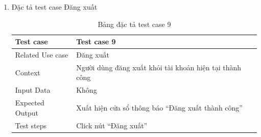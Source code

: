\documentclass[a4paper, 12pt]{article}
\begin{document}
\begin{enumerate}
	\item Đặc tả test case Đăng xuất
	\begin{table}[H]
		\centering
		\begin{tabular}{|l|l|} 
		\hline
		\multicolumn{1}{|l|}{Test case} & \multicolumn{1}{l|}{Test case 9}                         \\ 
		\hline
		Related Use case                & Đăng xuất                                                \\ 
		\hline
		Context                         & Người dùng đăng xuất khỏi tài khoản hiện tại thành công  \\ 
		\hline
		Input Data                      & Không                                                    \\ 
		\hline
		Expected Output                 & Xuất hiện cửa sổ thông báo “Đăng xuất thành công”        \\ 
		\hline
		Test steps                      & Click nút “Đăng xuất”                                  \\
		\hline
		\end{tabular}
		\caption{Bảng đặc tả test case 9}
	\end{table}

	\clearpage


\end{enumerate}
\end{document}
